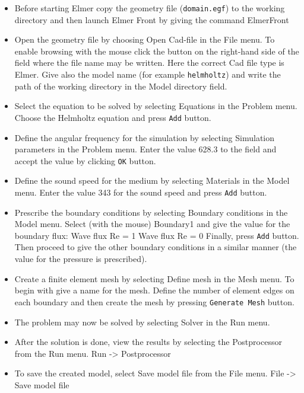 \begin{itemize}

\item Before starting Elmer copy the geometry file ({\tt domain.egf}) to the 
working directory and then launch Elmer Front by giving the command
\ttbegin
ElmerFront
\ttend 

\item Open the geometry file by choosing Open Cad-file in the  
File menu. To enable browsing with the mouse click the button on the 
right-hand side of the field where the file name may be written. Here
the correct Cad file type is Elmer. Give also the model name (for example
{\tt helmholtz}) and write the path of the working directory in the
Model directory field.  

\item Select the equation to be solved by selecting Equations in
the Problem menu. Choose the Helmholtz equation and press 
{\tt Add} button. 

\item Define the angular frequency for the simulation by selecting 
Simulation parameters in the Problem menu. Enter the value
628.3 to the field and accept the value by clicking {\tt OK} button.

\item Define the sound speed for the medium by selecting 
Materials in the Model menu. Enter the value
343 for the sound speed and press {\tt Add} button.

\item Prescribe the boundary conditions by selecting 
Boundary conditions in the Model menu. Select (with the mouse)
Boundary1 and give the value for the boundary flux: 
\ttbegin
Wave flux Re = 1
Wave flux Re = 0
\ttend 
Finally, press {\tt Add} button. Then proceed to give 
the other boundary conditions in a similar manner (the value for the 
pressure is prescribed).

\item Create a finite element mesh  by selecting 
Define mesh in the Mesh menu. To begin with give a name for the mesh.
Define the number of element
edges on each boundary and then create the mesh by pressing
{\tt Generate Mesh} button.   

\item The problem may now be solved by selecting Solver in the Run menu.

\item After the solution is done, view the results by selecting the
Postprocessor from the Run menu.
\ttbegin
Run -> Postprocessor
\ttend
\item To save the created model, select Save model file from the File menu.
\ttbegin
File -> Save model file
\ttend
\end{itemize}


